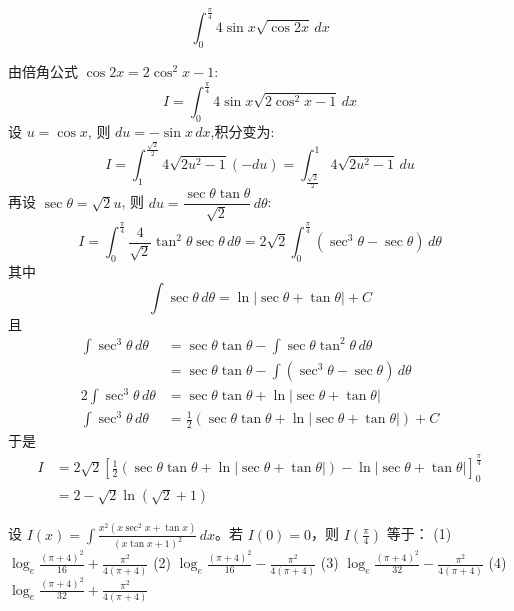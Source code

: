 \begin{questions}
    \question
    \[
    \int_{0}^{\frac{\pi}{4}} 4\sin x\sqrt{\cos 2x} \,dx
    \]
    \begin{solution}
        由倍角公式 $\cos 2x = 2\cos^2 x - 1$:
        \[
        I = \int_{0}^{\frac{\pi}{4}} 4\sin x\sqrt{2\cos^2 x - 1} \,dx
        \]
        设 $u = \cos x$, 则 $du = -\sin x \,dx$,积分变为:
        \[
        I = \int_{1}^{\frac{\sqrt{2}}{2}} 4\sqrt{2u^2 - 1} (-du) = \int_{\frac{\sqrt{2}}{2}}^{1} 4\sqrt{2u^2 - 1} \,du
        \]
        再设 $\sec \theta = \sqrt{2}u$, 则 $du = \dfrac{\sec \theta \tan \theta}{\sqrt{2}} \,d\theta$:
        \[
        I = \int_{0}^{\frac{\pi}{4}} \frac{4}{\sqrt{2}} \tan^2 \theta \sec \theta \,d\theta = 2\sqrt{2} \int_{0}^{\frac{\pi}{4}} (\sec^3 \theta - \sec \theta) \,d\theta
        \]
        其中
        \[
        \int \sec \theta \,d\theta = \ln |\sec \theta + \tan \theta| + C
        \]
        且
        \begin{align*}
        \int \sec^3 \theta \,d\theta &= \sec \theta \tan \theta - \int \sec \theta \tan^2 \theta \,d\theta \\
        &= \sec \theta \tan \theta - \int (\sec^3 \theta - \sec \theta) \,d\theta \\
        2 \int \sec^3 \theta \,d\theta &= \sec \theta \tan \theta + \ln |\sec \theta + \tan \theta| \\
        \int \sec^3 \theta \,d\theta &= \frac{1}{2} (\sec \theta \tan \theta + \ln |\sec \theta + \tan \theta|) + C
        \end{align*}
        于是
        \begin{align*}
        I &= 2\sqrt{2} \left[ \frac{1}{2}(\sec \theta \tan \theta + \ln|\sec \theta + \tan \theta|) - \ln|\sec \theta + \tan \theta| \right]_{0}^{\frac{\pi}{4}} \\
        &= 2 - \sqrt{2}\ln(\sqrt{2} + 1)
        \end{align*}
    \end{solution}

    \question
设 $I(x) = \int \frac{x^2(x \sec^2 x + \tan x)}{(x \tan x + 1)^2} \,dx$。若 $I(0) = 0$，则 $I\left(\frac{\pi}{4}\right)$ 等于：
(1) $\log_e \frac{(\pi+4)^2}{16} + \frac{\pi^2}{4(\pi+4)}$ \quad (2) $\log_e \frac{(\pi+4)^2}{16} - \frac{\pi^2}{4(\pi+4)}$
(3) $\log_e \frac{(\pi+4)^2}{32} - \frac{\pi^2}{4(\pi+4)}$ \quad (4) $\log_e \frac{(\pi+4)^2}{32} + \frac{\pi^2}{4(\pi+4)}$


\end{questions}
